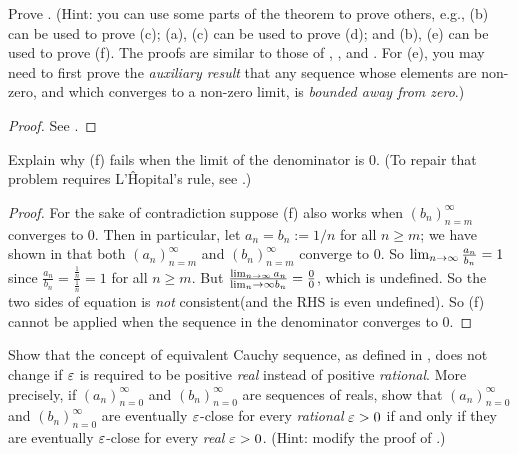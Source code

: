 \begin{exercise} \label{exercise 6.1.8}
Prove .
(Hint: you can use some parts of the theorem to prove others, e.g., (b) can be used to prove (c);
(a), (c) can be used to prove (d);
and (b), (e) can be used to prove (f).
The proofs are similar to those of , , and .
For (e), you may need to first prove the \emph{auxiliary result} that any sequence whose elements are non-zero, and which converges to a non-zero limit, is \emph{bounded away from zero}.)
\end{exercise}

\begin{proof}
See .
\end{proof}

\begin{exercise} \label{exercise 6.1.9}
Explain why (f) fails when the limit of the denominator is \(0\).
(To repair that problem requires L’\^{H}opital’s rule, see .)
\end{exercise}

\begin{proof}
For the sake of contradiction suppose (f) also works when \((b_n)_{n = m}^{\infty}\) converges to \(0\).
Then in particular, let \(a_n = b_n := 1/n\) for all \(n \ge m\); we have shown in  that both \((a_n)_{n = m}^{\infty}\) and \((b_n)_{n = m}^{\infty}\) converge to \(0\).
So \(\lim_{n \to \infty} \frac{a_n}{b_n} = 1\) since \(\frac{a_n}{b_n} = \frac{\frac{1}{n}}{\frac{1}{n}} = 1\) for all \(n \ge m\).
But \(\frac{\lim_{n \to \infty} a_n}{\lim_n \to \infty b_n} = \frac{0}{0}\), which is undefined.
So the two sides of equation is \emph{not} consistent(and the RHS is even undefined).
So (f) cannot be applied when the sequence in the denominator converges to \(0\).
\end{proof}

\begin{exercise} \label{exercise 6.1.10}
Show that the concept of equivalent Cauchy sequence, as defined in , does not change if \(\varepsilon\) is required to be positive \emph{real} instead of positive \emph{rational}.
More precisely, if \((a_n)_{n = 0}^{\infty}\) and \((b_n)_{n = 0}^{\infty}\) are sequences of reals, show that \((a_n)_{n = 0}^{\infty}\) and \((b_n)_{n = 0}^{\infty}\) are eventually \(\varepsilon\)-close for every \emph{rational} \(\varepsilon > 0\) if and only if they are eventually \(\varepsilon\)-close for every \emph{real} \(\varepsilon > 0\).
(Hint: modify the proof of .)
\end{exercise}

